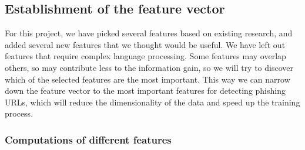 \documentclass{article}
\begin{document}
    \subsection{Establishment of the feature vector}\label{subsec:establishement-of-the-feature-vector}

    For this project, we have picked several features based on existing research, and added several new features that we thought would be useful.
    We have left out features that require complex language processing.
    Some features may overlap others, so may contribute less to the information gain, so we will try to discover which of the selected features are the most important.
    This way we can narrow down the feature vector to the most important features for detecting phishing URLs, which will reduce the dimensionality of the data and speed up the training process.

    \subsubsection{Computations of different features}
\end{document}
